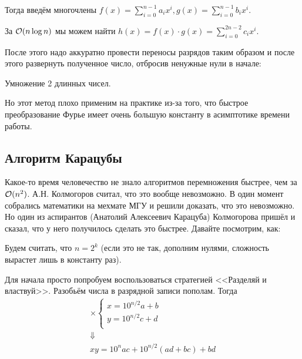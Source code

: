Тогда введём многочлены $f(x) = \sum\limits_{i = 0}^{n - 1} a_ix^i,
g(x) = \sum\limits_{i = 0}^{n - 1} b_ix^i$.

За $\mathcal{O}(n\log n)$ мы можем найти $h(x) = f(x) \cdot g(x) = \sum\limits_{i = 0}^{2n - 2} c_i x^i$.

После этого надо аккуратно провести переносы разрядов таким образом и после этого
развернуть полученное число, отбросив ненужные нули в начале:

\begin{algorithm}
  \caption{Умножение 2 длинных чисел.}
  \begin{algorithmic}[1]
     
      \EndFor
    \EndFunction
  \end{algorithmic}
\end{algorithm}

Но этот метод плохо применим на практике из-за того, что быстрое преобразование
Фурье имеет очень большую константу в асимптотике времени работы.

\subsection{Алгоритм Карацубы}

Какое-то время человечество не знало алгоритмов перемножения быстрее, чем за
$\mathcal{O}(n^2)$. А.Н. Колмогоров считал, что это вообще невозможно. В один момент
собрались математики на мехмате МГУ и решили доказать, что это невозможно. Но
один из аспирантов (Анатолий Алексеевич Карацуба) Колмогорова пришёл и сказал, что у него получилось сделать
это быстрее. Давайте посмотрим, как:

Будем считать, что $n = 2^k$ (если это не так, дополним нулями, сложность вырастет лишь в константу раз).

Для начала просто попробуем воспользоваться стратегией <<Разделяй и властвуй>>. Разобьём числа в 
разрядной записи пополам. Тогда
\[\begin{array}{c}
\times \begin{cases}
x = 10^{n/2}a + b\\
y = 10^{n/2}c + d\\
\end{cases} \\
\Downarrow\\
xy = 10^{n}ac + 10^{n/2}(ad+bc)+bd
\end{array}\]

